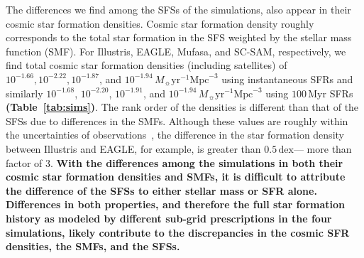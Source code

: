 \documentclass[tighten, preprint]{aastex62}
\begin{document}

The differences we find among the SFSs of the simulations, also appear in their 
cosmic star formation densities. Cosmic star formation density roughly corresponds to the total 
star formation in the SFS weighted by the stellar mass function (SMF). For Illustris,
EAGLE, {\sc Mufasa}, and SC-SAM, respectively, we find total cosmic star formation 
densities (including satellites) of 
$10^{-1.66}, 10^{-2.22}, 10^{-1.87}$, and $10^{-1.94}\,M_\sun \mathrm{yr}^{-1} \mathrm{Mpc}^{-3}$ 
using instantaneous SFRs and similarly 
$10^{-1.68}$, $10^{-2.20}$, $10^{-1.91}$, and $10^{-1.94}\,M_\sun \mathrm{yr}^{-1} \mathrm{Mpc}^{-3}$
using $100\,\mathrm{Myr}$ SFRs 
{\bf \color{red} (Table~\ref{tab:sims})}. 
The rank order of the densities is different than that of the
SFSs due to differences in the SMFs. Although these values are 
roughly within the uncertainties of observations~\citep{madau2014}, 
the difference in the star formation density between Illustris and 
EAGLE, for example, is greater than $0.5\,\mathrm{dex}$--- more 
than factor of 3.
{\bf \color{red}
With the differences among the simulations in both their cosmic star 
formation densities and SMFs, it is difficult to attribute the difference 
of the SFSs to either stellar mass or SFR alone. Differences in both properties, 
and therefore the full star formation history as modeled by different sub-grid 
prescriptions in the four simulations, likely contribute to the discrepancies 
in the cosmic SFR densities, the SMFs, and the SFSs. 
}
\end{document}
